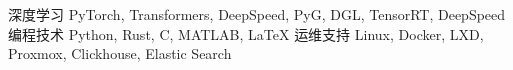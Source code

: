 

\begin{cvskills}
  \cvskill
    {深度学习} %
    {PyTorch, Transformers, DeepSpeed, PyG, DGL, TensorRT, DeepSpeed} %
  \cvskill
    {编程技术} %
    {Python, Rust, C, MATLAB, LaTeX}
  \cvskill
    {运维支持}
    {Linux, Docker, LXD, Proxmox, Clickhouse, Elastic Search}

\end{cvskills}
